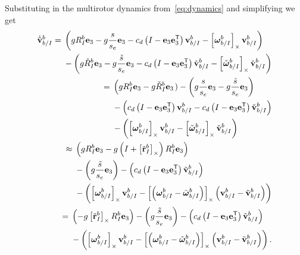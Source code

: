 Substituting in the multirotor dynamics from~\eqref{eq:dynamics} and simplifying
we get
\begin{align}
\begin{split}
  \dot{\tilde{\vect{v}}}_{b/I}^{b} ={}& \left(gR_I^b \vect{e}_3 -
    g\frac{s}{s_e}\vect{e}_3
    -\drag \left( I - \vect{e}_3 \vect{e}_3^\transpose \right) \vect{v}_{b/I}^b -
                  \skewmat{\vect{\omega}_{b/I}^b}\vect{v}_{b/I}^b\right) \\
    &- \left(g\des{R}_I^b \vect{e}_3 - g\frac{\des{s}}{s_e}\vect{e}_3
    - \drag \left( I - \vect{e}_3 \vect{e}_3^\transpose \right) \des{\vect{v}}_{b/I}^b -
    \skewmat{\des{\vect{\omega}}_{b/I}^b}\des{\vect{v}}_{b/I}^b\right) \\
\end{split} \\
\begin{split}
  \phantom{\dot{\tilde{\vect{v}}}_{b/I}^{b}}={}& \left(gR_I^b \vect{e}_3 -
  g\des{R}_I^b \vect{e}_3\right.) - \left(g\frac{s}{s_e}\vect{e}_3 -
      g\frac{\des{s}}{s_e}\vect{e}_3\right) \\
                                               &-\left(\drag \left( I - \vect{e}_3 \vect{e}_3^\transpose \right)
      \vect{v}_{b/I}^b
    - \drag \left( I - \vect{e}_3 \vect{e}_3^\transpose \right) \des{\vect{v}}_{b/I}^b
    \right) \\
    &- \left(\skewmat{\vect{\omega}_{b/I}^b}\vect{v}_{b/I}^b -
    \skewmat{\des{\vect{\omega}}_{b/I}^b} \des{\vect{v}}_{b/I}^b\right) \\
\end{split} \\
\begin{split}
  \phantom{\dot{\tilde{\vect{v}}}_{b/I}^{b}} \approx {}& \left(gR_I^b \vect{e}_3 -
    g\left( I + \skewmat{\tilde{\vect{r}}_I^b} \right) R_{I}^{b}
  \vect{e}_3\right) \\
    &-\left(g\frac{\tilde{s}}{s_e}\vect{e}_3\right)
    -\left(\drag \left( I - \vect{e}_3 \vect{e}_3^\transpose \right)
    \tilde{\vect{v}}_{b/I}^b\right) \\
    &- \left(\skewmat{\vect{\omega}_{b/I}^b}\vect{v}_{b/I}^b
    -\skewmat{\left(\vect{\omega}_{b/I}^{b} - \tilde{\vect{\omega}}_{b/I}^{b}\right)} 
  \left(\vect{v}_{b/I}^{b} - \tilde{\vect{v}}_{b/I}^{b}\right)\right) \\
\end{split} \\
\begin{split}
  \phantom{\dot{\tilde{\vect{v}}}_{b/I}^{b}} = {}& \left(-g
  \skewmat{\tilde{\vect{r}}_I^b} R_I^b \vect{e}_3\right)
    -\left(g\frac{\tilde{s}}{s_e}\vect{e}_3\right)
    -\left(\drag \left( I - \vect{e}_3 \vect{e}_3^\transpose \right)
    \tilde{\vect{v}}_{b/I}^b\right) \\
    &- \left(\skewmat{\vect{\omega}_{b/I}^b}\vect{v}_{b/I}^b
    -\skewmat{\left(\vect{\omega}_{b/I}^{b} - \tilde{\vect{\omega}}_{b/I}^{b}\right)} 
  \left(\vect{v}_{b/I}^{b} - \tilde{\vect{v}}_{b/I}^{b}\right)\right). \\
\end{split}
\end{align}
